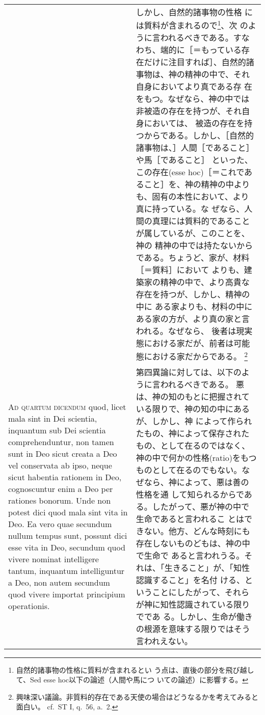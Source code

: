 \documentclass[10pt]{jsarticle} %
\begin{document}
\begin{longtable}{p{21em}p{21em}}
&

しかし、自然的諸事物の性格
 には質料が含まれるので\footnote{自然的諸事物の性格に質料が含まれるとい
 う点は、直後の部分を飛び越して、Sed esse hoc以下の論述（人間や馬につ
 いての論述）に影響する。}、次
 のように言われるべきである。すなわち、端的に［＝もっている存在だけに注目すれば］、自然的諸事物は、神の精神の中で、それ自身においてより真である存
 在をもつ。なぜなら、神の中では非被造の存在を持つが、それ自身においては、
 被造の存在を持つからである。しかし、［自然的諸事物は、］人間［であること］や馬［であること］
 といった、この存在(esse hoc)［＝これであること］を、神の精神の中よりも、固有の本性において、より真に持っている。な
 ぜなら、人間の真理には質料的であることが属しているが、このことを、神の
 精神の中では持たないからである。ちょうど、家が、材料［＝質料］において
 よりも、建築家の精神の中で、より高貴な存在を持つが、しかし、精神の中に
 ある家よりも、材料の中にある家の方が、より真の家と言われる。なぜなら、
 後者は現実態における家だが、前者は可能態における家だからである。
 \footnote{興味深い議論。非質料的存在である天使の場合はどうなるかを考えてみると面白い。
 cf.~ST I, q.~56, a.~2.}




\\




{\scshape Ad quartum dicendum} quod, licet mala sint in
 Dei scientia, inquantum sub Dei scientia comprehenduntur, non tamen
 sunt in Deo sicut creata a Deo vel conservata ab ipso, neque sicut
 habentia rationem in Deo, cognoscuntur enim a Deo per rationes
 bonorum. Unde non potest dici quod mala sint vita in Deo. Ea vero quae
 secundum nullum tempus sunt, possunt dici esse vita in Deo, secundum
 quod vivere nominat intelligere tantum, inquantum intelliguntur a Deo,
 non autem secundum quod vivere importat principium operationis.


&


第四異論に対しては、以下のように言われるべきである。
悪は、神の知のもとに把握されている限りで、神の知の中にあるが、しかし、神
 によって作られたもの、神によって保存されたもの、として在るのではなく、
 神の中で何かの性格(ratio)をもつものとして在るのでもない。なぜなら、神によって、悪は善の性格を通
 して知られるからである。したがって、悪が神の中で生命であると言われるこ
 とはできない。他方、どんな時刻にも存在しないものどもは、神の中で生命で
 あると言われうる。それは、「生きること」が、「知性認識すること」を名付
 ける、ということにしたがって、それらが神に知性認識されている限りでであ
 る。しかし、生命が働きの根源を意味する限りではそう言われえない。


\end{longtable}
\end{document}

